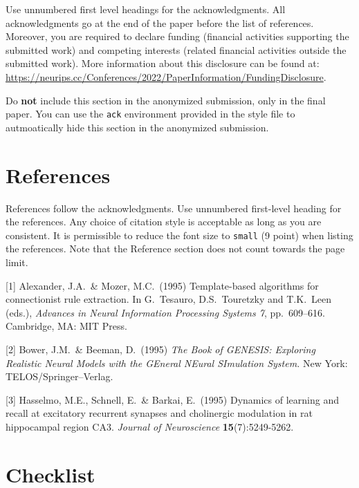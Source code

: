 \documentclass{article}
\begin{document}
\begin{ack}
Use unnumbered first level headings for the acknowledgments. All acknowledgments
go at the end of the paper before the list of references. Moreover, you are required to declare
funding (financial activities supporting the submitted work) and competing interests (related financial activities outside the submitted work).
More information about this disclosure can be found at: \url{https://neurips.cc/Conferences/2022/PaperInformation/FundingDisclosure}.


Do {\bf not} include this section in the anonymized submission, only in the final paper. You can use the \texttt{ack} environment provided in the style file to autmoatically hide this section in the anonymized submission.
\end{ack}


\section*{References}


References follow the acknowledgments. Use unnumbered first-level heading for
the references. Any choice of citation style is acceptable as long as you are
consistent. It is permissible to reduce the font size to \verb+small+ (9 point)
when listing the references.
Note that the Reference section does not count towards the page limit.
\medskip


{
\small


[1] Alexander, J.A.\ \& Mozer, M.C.\ (1995) Template-based algorithms for
connectionist rule extraction. In G.\ Tesauro, D.S.\ Touretzky and T.K.\ Leen
(eds.), {\it Advances in Neural Information Processing Systems 7},
pp.\ 609--616. Cambridge, MA: MIT Press.


[2] Bower, J.M.\ \& Beeman, D.\ (1995) {\it The Book of GENESIS: Exploring
  Realistic Neural Models with the GEneral NEural SImulation System.}  New York:
TELOS/Springer--Verlag.


[3] Hasselmo, M.E., Schnell, E.\ \& Barkai, E.\ (1995) Dynamics of learning and
recall at excitatory recurrent synapses and cholinergic modulation in rat
hippocampal region CA3. {\it Journal of Neuroscience} {\bf 15}(7):5249-5262.
}


\section*{Checklist}
\end{document}
